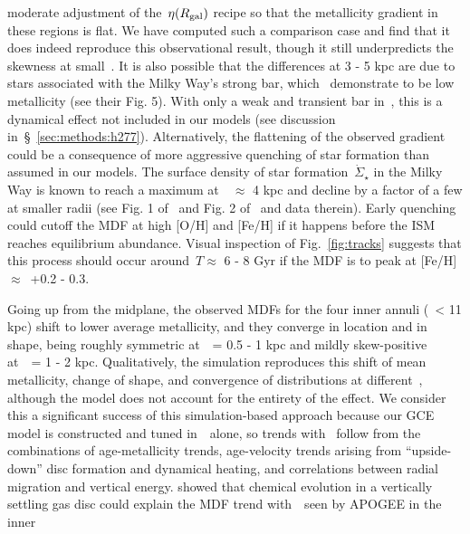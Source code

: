 \documentclass[draft2.tex]{subfiles}
\begin{document}
moderate adjustment of the~$\eta(R_\text{gal})$ recipe so that the metallicity 
gradient in these regions is flat. 
We have computed such a comparison case and find that it does indeed reproduce 
this observational result, though it still underpredicts the skewness at 
small~\rgal. 
{\color{red} 
It is also possible that the differences at 3 - 5 kpc are due to stars 
associated with the Milky Way's strong bar, which~\citet{Bovy2019} demonstrate 
to be low metallicity (see their Fig. 5). 
With only a weak and transient bar in~\hsim, this is a dynamical effect not 
included in our models (see discussion in~\S~\ref{sec:methods:h277}). 
}
Alternatively, the flattening of the observed gradient could be a consequence 
of more aggressive quenching of star formation than assumed in our models. 
The surface density of star formation~$\dot{\Sigma}_\star$ in the Milky Way 
is known to reach a maximum at~\rgal~$\approx$ 4 kpc and decline by a factor 
of a few at smaller radii (see Fig. 1 of~\citealp{Peek2009} and Fig. 2 
of~\citealp{Fraternali2012} and data therein). 
Early quenching could cutoff the MDF at high [O/H] and [Fe/H] if it happens 
before the ISM reaches equilibrium abundance. 
Visual inspection of Fig.~\ref{fig:tracks} suggests that this process should 
occur around~$T \approx$ 6 - 8 Gyr if the MDF is to peak at 
[Fe/H]~$\approx$~+0.2 - 0.3. 
\par 
Going up from the midplane, the observed MDFs for the four inner annuli 
(\rgal~< 11 kpc) shift to lower average metallicity, and they converge in 
location and in shape, being roughly symmetric at~\absz~= 0.5 - 1 kpc and 
mildly skew-positive at~\absz~= 1 - 2 kpc. 
Qualitatively, the simulation reproduces this shift of mean metallicity, change 
of shape, and convergence of distributions at different~\rgal, although the 
model does not account for the entirety of the effect. 
We consider this a significant success of this simulation-based approach 
because our GCE model is constructed and tuned in~\rgal~alone, so trends with 
\absz~follow from the combinations of age-metallicity trends, age-velocity 
trends arising from ``upside-down'' disc formation and dynamical heating, and 
correlations between radial migration and vertical energy. 
\citet{Freudenburg2017} showed that chemical evolution in a vertically settling 
gas disc could explain the MDF trend with~\absz~seen by APOGEE in the inner 
\end{document}

